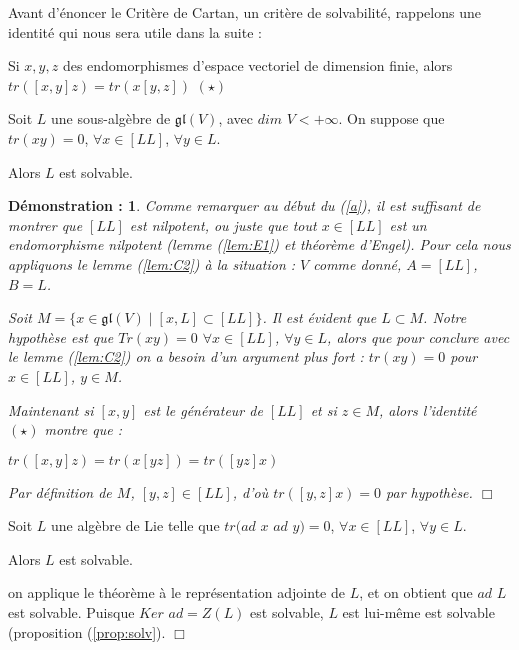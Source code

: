 \documentclass[a4paper,openany,12pt]{report}
\newcommand{\gl}{\mathfrak{gl}}
\theoremstyle{break}
{\theorembodyfont{\upshape}
\newtheorem*{rmq}{Remarque :}
\newtheorem*{prv}{Preuve :}
\newtheorem*{ex}{Exemples :}
\newtheorem{exe}{Exemple : }
\newtheorem*{nota}{Notation :}}
\newtheorem*{dem}{D\'emonstration :}
\begin{document}
Avant d'énoncer le Critère de Cartan, un critère de solvabilité, rappelons une identité qui nous sera utile dans la suite : 
\begin{center}
Si $x,y,z$ des endomorphismes d'espace vectoriel de dimension finie, alors $tr([x,y]z)=tr(x[y,z])$ $(\star)$
\end{center}

\begin{thm}\label{th:cartan}
Soit $L$ une sous-algèbre de $\gl(V)$, avec $dim$ $V<+\infty$. On suppose que $tr(xy)=0$, $\forall x \in [LL]$, $\forall y \in L$.

Alors $L$ est solvable. 
\end{thm}

\begin{dem}
\quad Comme remarquer au début du (\ref{a}), il est suffisant de montrer que $[LL]$ est nilpotent, ou juste que tout $x \in [LL]$ est un endomorphisme nilpotent (lemme (\ref{lem:E1}) et théorème d'Engel). Pour cela nous appliquons le lemme (\ref{lem:C2}) à la situation : $V$ comme donné, $A=[LL]$, $B=L$.

Soit $M= \{ x \in \gl(V) \mid [x,L] \subset [LL] \}$. Il est évident que $L \subset M$. Notre hypothèse est que $Tr(xy)=0$ $\forall x \in [LL]$, $\forall y \in L$, alors que pour conclure avec le lemme (\ref{lem:C2}) on a besoin d'un argument plus fort : \quad $tr(xy)=0$ pour $x \in [LL]$, $y \in M$.

Maintenant si $[x,y]$ est le générateur de $[LL]$ et si $z \in M$, alors l'identité $(\star)$ montre que :
\begin{center}
$tr([x,y]z)=tr(x[yz])=tr([yz]x)$
\end{center}
Par définition de $M$, $[y,z] \in [LL]$, d'où $tr([y,z]x)=0$ par hypothèse. $\Box$
\end{dem}

\begin{cor}
\quad Soit $L$ une algèbre de Lie telle que $tr(ad$ $x$ $ad$ $y) = 0$, $\forall x \in [LL]$, $\forall y \in  L$.

Alors $L$ est solvable.
\end{cor}

\begin{prv}
\quad on applique le théorème à le représentation adjointe de $L$, et on obtient que $ad$ $L$ est solvable. Puisque $Ker$ $ad = Z(L)$ est solvable, $L$ est lui-même est solvable (proposition (\ref{prop:solv}). $\Box$
\end{prv}
\end{document}
